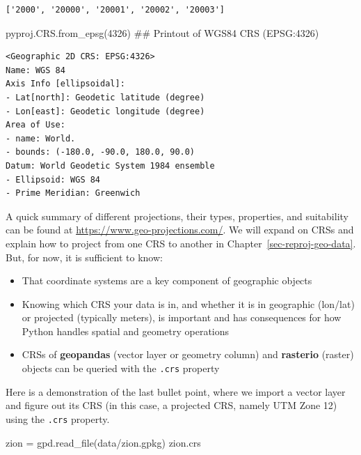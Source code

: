 \documentclass[
  letterpaper,
]{krantz}
\newenvironment{Shaded}{\begin{snugshade}}{\end{snugshade}}
\newcommand{\CommentTok}[1]{\textcolor[rgb]{0.37,0.37,0.37}{#1}}
\newcommand{\DecValTok}[1]{\textcolor[rgb]{0.68,0.00,0.00}{#1}}
\newcommand{\NormalTok}[1]{\textcolor[rgb]{0.00,0.23,0.31}{#1}}
\newcommand{\OperatorTok}[1]{\textcolor[rgb]{0.37,0.37,0.37}{#1}}
\newcommand{\StringTok}[1]{\textcolor[rgb]{0.13,0.47,0.30}{#1}}
\providecommand{\tightlist}{%
  \setlength{\itemsep}{0pt}\setlength{\parskip}{0pt}}\usepackage{longtable,booktabs,array}
\begin{document}
\begin{verbatim}
['2000', '20000', '20001', '20002', '20003']
\end{verbatim}

\begin{Shaded}
\begin{Highlighting}[]
\NormalTok{pyproj.CRS.from\_epsg(}\DecValTok{4326}\NormalTok{)  }\CommentTok{\#\# Printout of WGS84 CRS (EPSG:4326)}
\end{Highlighting}
\end{Shaded}

\begin{verbatim}
<Geographic 2D CRS: EPSG:4326>
Name: WGS 84
Axis Info [ellipsoidal]:
- Lat[north]: Geodetic latitude (degree)
- Lon[east]: Geodetic longitude (degree)
Area of Use:
- name: World.
- bounds: (-180.0, -90.0, 180.0, 90.0)
Datum: World Geodetic System 1984 ensemble
- Ellipsoid: WGS 84
- Prime Meridian: Greenwich
\end{verbatim}

A quick summary of different projections, their types, properties, and
suitability can be found at \url{https://www.geo-projections.com/}. We
will expand on CRSs and explain how to project from one CRS to another
in Chapter~\ref{sec-reproj-geo-data}. But, for now, it is sufficient to
know:

\begin{itemize}
\tightlist
\item
  That coordinate systems are a key component of geographic objects
\item
  Knowing which CRS your data is in, and whether it is in geographic
  (lon/lat) or projected (typically meters), is important and has
  consequences for how Python handles spatial and geometry operations
\item
  CRSs of \textbf{geopandas} (vector layer or geometry column) and
  \textbf{rasterio} (raster) objects can be queried with the
  \texttt{.crs} property
\end{itemize}

Here is a demonstration of the last bullet point, where we import a
vector layer and figure out its CRS (in this case, a projected CRS,
namely UTM Zone 12) using the \texttt{.crs} property.

\begin{Shaded}
\begin{Highlighting}[]
\NormalTok{zion }\OperatorTok{=}\NormalTok{ gpd.read\_file(}\StringTok{\textquotesingle{}data/zion.gpkg\textquotesingle{}}\NormalTok{)}
\NormalTok{zion.crs}
\end{Highlighting}
\end{Shaded}
\end{document}

